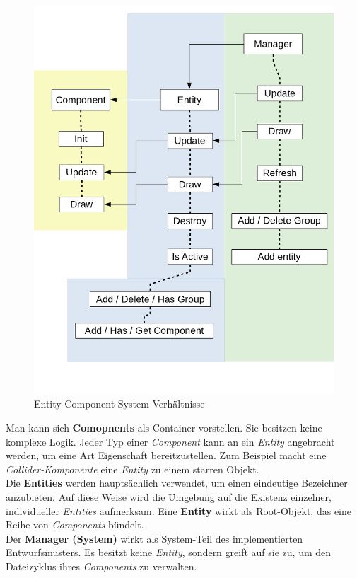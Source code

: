 \documentclass[
  10pt,
  a4paper,
  oneside,
  headers,
  headinclude,
  footinclude,
  BCOR5mm,
]{article}
\begin{document}
\begin{figure}[H]
  \centering
  \includegraphics[scale=0.3]{Scheme}
  \caption{Entity-Component-System Verhältnisse}
  \label{fig:ECS}
\end{figure}

Man kann sich \textbf{Comopnents} als Container vorstellen. Sie besitzen keine
komplexe Logik. Jeder Typ einer \textit{Component} kann an ein \textit{Entity}
angebracht werden, um eine Art Eigenschaft bereitzustellen. Zum Beispiel macht
eine \textit{Collider-Komponente} eine \textit{Entity} zu einem starren Objekt. \\
Die \textbf{Entities} werden hauptsächlich verwendet, um einen eindeutige
Bezeichner anzubieten. Auf diese Weise wird die Umgebung auf die Existenz
einzelner, individueller \textit{Entities} aufmerksam. Eine \textbf{Entity}
wirkt als Root-Objekt, das eine Reihe von \textit{Components} bündelt. \\
Der \textbf{Manager (System)} wirkt als System-Teil des implementierten
Entwurfsmusters. Es besitzt keine \textit{Entity}, sondern greift auf sie zu, um
den Dateizyklus ihres \textit{Components} zu verwalten.
\end{document}
